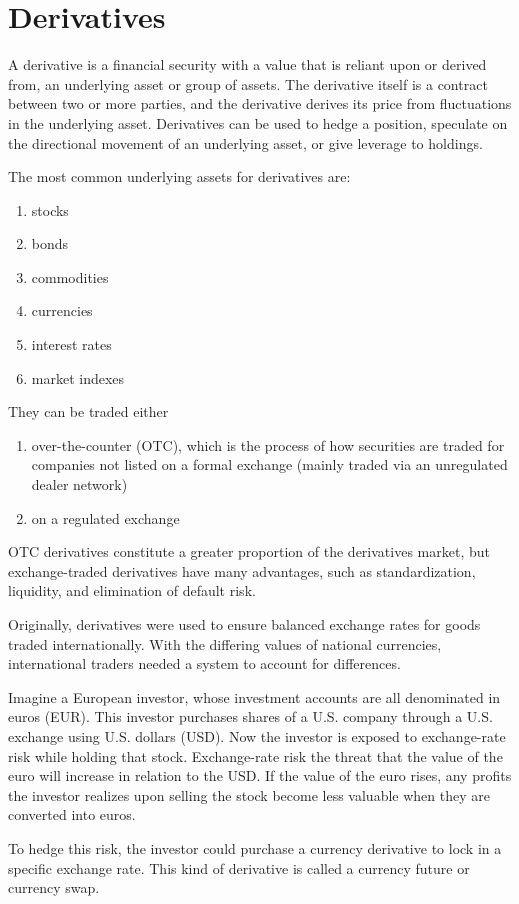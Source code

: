 \documentclass{article}
\begin{document}
\section{Derivatives}

  \begin{definition}[Derivatives]
    A derivative is a financial security with a value that is reliant upon or derived from, an underlying asset or group of assets. The derivative itself is a contract between two or more parties, and the derivative derives its price from fluctuations in the underlying asset. Derivatives can be used to hedge a position, speculate on the directional movement of an underlying asset, or give leverage to holdings. 

    The most common underlying assets for derivatives are: 
    \begin{enumerate}
      \item stocks
      \item bonds
      \item commodities
      \item currencies
      \item interest rates 
      \item market indexes 
    \end{enumerate}
    They can be traded either 
    \begin{enumerate}
        \item over-the-counter (OTC), which is the process of how securities are traded for companies not listed on a formal exchange (mainly traded via an unregulated dealer network)
        \item on a regulated exchange
    \end{enumerate}
    OTC derivatives constitute a greater proportion of the derivatives market, but exchange-traded derivatives have many advantages, such as standardization, liquidity, and elimination of default risk. 
  \end{definition}

  Originally, derivatives were used to ensure balanced exchange rates for goods traded internationally. With the differing values of national currencies, international traders needed a system to account for differences. 

  \begin{example}
    Imagine a European investor, whose investment accounts are all denominated in euros (EUR). This investor purchases shares of a U.S. company through a U.S. exchange using U.S. dollars (USD). Now the investor is exposed to exchange-rate risk while holding that stock. Exchange-rate risk the threat that the value of the euro will increase in relation to the USD. If the value of the euro rises, any profits the investor realizes upon selling the stock become less valuable when they are converted into euros.

    To hedge this risk, the investor could purchase a currency derivative to lock in a specific exchange rate. This kind of derivative is called a currency future or currency swap. 
  \end{example}
\end{document}
